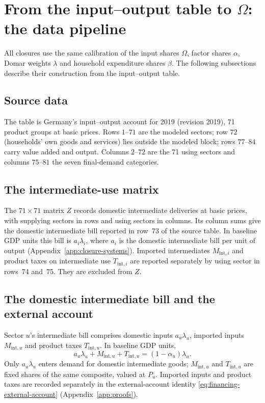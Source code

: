 \section{From the input--output table to $\Omega$: the data pipeline}\label{app:pipeline}

All closures use the same calibration of the input shares $\Omega$, factor shares $\alpha$, Domar weights $\lambda$ and household expenditure shares $\beta$. The following subsections describe their construction from the input--output table.

\subsection{Source data}\label{app:pipeline-source}

The table is Germany's input--output account for 2019 (revision 2019), 71 product groups at basic prices. Rows $1$--$71$ are the modeled sectors; row $72$ (households' own goods and services) lies outside the modeled block; rows $77$--$84$ carry value added and output. Columns $2$--$72$ are the 71 using sectors and columns $75$--$81$ the seven final-demand categories.

\subsection{The intermediate-use matrix}\label{app:pipeline-z}

The $71\times71$ matrix $Z$ records domestic intermediate deliveries at
basic prices, with supplying sectors in rows and using sectors in columns.
Its column sums give the domestic intermediate bill reported in row~73 of the source table. In baseline GDP units this bill is $a_i\lambda_i$, where $a_i$ is the domestic intermediate bill per unit of output (Appendix~\ref{app:closure-systems}). Imported intermediates $M_{\mathrm{int},i}$ and product taxes
on intermediate use $T_{\mathrm{int},i}$ are reported separately by using sector in
rows~74 and~75. They are excluded from $Z$.

\subsection{The domestic intermediate bill and the external account}\label{app:abill}

Sector $u$'s intermediate bill comprises domestic inputs $a_u\lambda_u$, imported inputs $M_{\mathrm{int},u}$ and product taxes $T_{\mathrm{int},u}$. In baseline GDP units,
\[
a_u\lambda_u + M_{\mathrm{int},u} + T_{\mathrm{int},u}
= (1-\alpha_u)\lambda_u.
\]
Only $a_u\lambda_u$ enters demand for domestic intermediate goods; $M_{\mathrm{int},u}$ and $T_{\mathrm{int},u}$ are fixed shares of the same composite, valued at $P_u$. Imported inputs and product taxes are recorded separately in the external-account identity \eqref{eq:financing-external-account} (Appendix~\ref{app:proofs}).

